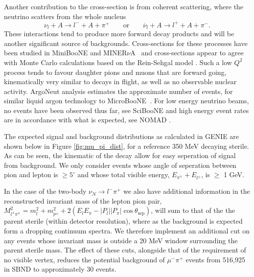 \documentclass[11pt, a4paper]{article}
\def\muboone{MicroBooNE}
\def\minerva{MINER$\nu$A}
\begin{document}
Another contribution to the cross-section is from coherent scattering, where
the neutrino scatters from the whole nucleus 
%
\[   \nu_l + A \to l^- + A + \pi^+ \qquad\text{or}\qquad \overline{\nu}_l + A
\to l^+ + A + \pi^-. \]
%
These interactions tend to produce more forward decay products and will be
another significant source of backgrounds. Cross-sections for these processes
have been studied in MiniBooNE \cite{Wascko:2006tx} and \minerva\
\cite{Eberly:2014mra} and cross-sections appear to agree with Monte Carlo
calculations based on the Rein-Sehgal model \cite{Rein:2006di, Rein:1982pf}.
Such a low $Q^2$ process tends to favour daughter pions and muons that are
forward going, kinematically very similar to decays in flight, as well as no
observable nuclear activity. ArgoNeut analysis estimates the approximate number
of events, for similar liquid argon technology to \muboone\
\cite{Acciarri:2014eit}. For low energy neutrino beams, no events have been
observed thus far, see SciBooNE \cite{Tanaka:2009ag} and high energy event
rates are in accordance with what is expected, see NOMAD
\cite{Kullenberg:2009pu}.

The expected signal and background distributions as calculated in GENIE are shown below in Figure \ref{fig:mu_pi_dist}, for a reference 350 MeV decaying sterile. As can be seen, the  
kinematic of the decay allow for easy seperation of signal from background. We only consider events whose angle of seperation between pion and lepton is $\geq 5^\circ$ and whose total visible energy, $E_{\pi^\mp}+E_{l^\pm}$,  is $\geq$ 1 GeV. 

In the case of the two-body $\nu_N \rightarrow l^- \pi^+$ we also have additional information in the reconstructed invariant mass of the lepton pion pair, $M_{l^\pm \pi^\mp}^2=m_l^2+m_{p^\pm}^2+ 2(E_l E_\pi - |P_l||P_\pi|\cos\theta_\text{sep})$, will sum to that of the the parent sterile (within detector resolution), where as the background is expected form a dropping continuum spectra. We therefore implement an additional cut on any events whose invariant mass is outside a 20 MeV window surrounding the parent sterile mass. The effect of these cuts, alongside that of the requirement of no visible vertex, reduces the potential background of $\mu^- \pi^+$ events from 516,925 in SBND to approximately 30 events. 
\end{document}
